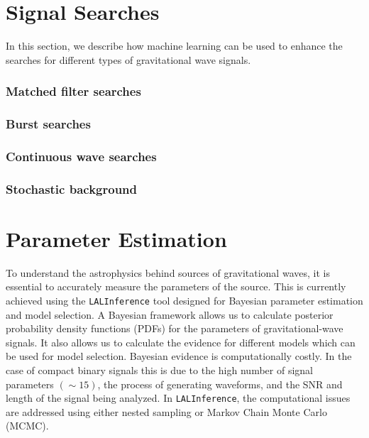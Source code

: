 \documentclass[letterpaper, aps, prd, superscriptaddress, showpacs, nofootinbib]{revtex4}
\begin{document}
\section{Signal Searches}
\label{sec:searches}

In this section, we describe how machine learning can be used to enhance the searches for 
different types of gravitational wave signals. 

\subsubsection{Matched filter searches}

\subsubsection{Burst searches}

\subsubsection{Continuous wave searches}

\subsubsection{Stochastic background}

\section{Parameter Estimation}
\label{sec:pe}

To understand the astrophysics behind sources of gravitational waves, it is essential to accurately 
measure the parameters of the source. This is currently achieved using the \texttt{LALInference} \cite{veitch:15}
tool designed for Bayesian parameter estimation and model selection. A Bayesian framework allows us to calculate posterior probability density functions (PDFs) for the parameters of gravitational-wave signals. It also allows us to calculate the evidence for different models which can be used for model selection. Bayesian evidence is computationally costly. In the case of compact binary signals this is due to the high number of signal parameters $(\sim 15)$, the process of generating waveforms, and the SNR and length of the signal being analyzed. In \texttt{LALInference}, the computational issues are addressed using either nested sampling \cite{2010PhRvD..81f2003V} or Markov Chain Monte Carlo (MCMC). 
\end{document}
